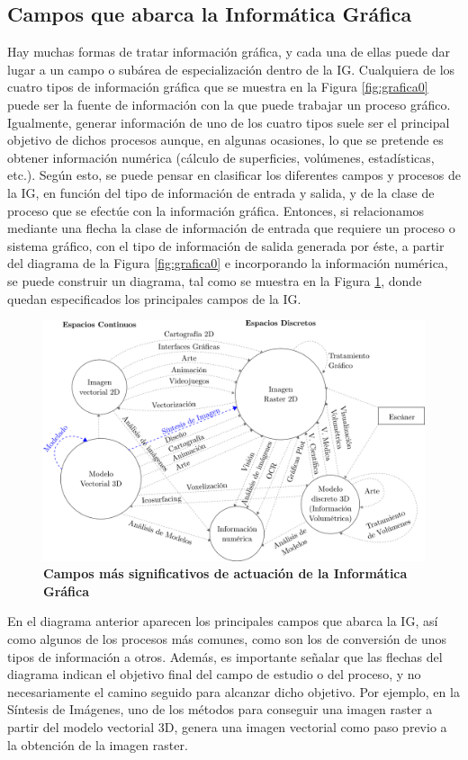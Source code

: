 \subsection{Campos que abarca la Informática Gráfica}
Hay muchas formas de tratar información gráfica, y cada una de ellas puede dar lugar a un campo o subárea de especialización dentro de la IG.
Cualquiera de los cuatro tipos de información gráfica que se muestra en la Figura \ref{fig:grafica0} puede ser la fuente de información con la que puede trabajar un proceso gráfico. Igualmente, generar información de uno de los cuatro tipos suele ser el principal objetivo de dichos procesos aunque, en algunas ocasiones, lo que se pretende es obtener información numérica (cálculo de superficies, volúmenes, estadísticas, etc.).
Según esto, se puede pensar en clasificar los diferentes campos y procesos de la IG, en función del tipo de información de entrada y salida, y de la clase de proceso que se efectúe con la información gráfica.
Entonces, si relacionamos mediante una flecha la clase de información de entrada que requiere un proceso o sistema gráfico, con el tipo de información de salida generada por éste, a partir del diagrama de la Figura \ref{fig:grafica0} e incorporando la información numérica, se puede construir un diagrama, tal como se muestra en la Figura \ref{fig:grafica1}, donde quedan especificados los principales campos de la IG.

\begin{figure}[h]
\includegraphics[width=16cm]{Img/CPD/grafica1.png}
\centering
\caption{\textbf{\footnotesize{Campos más significativos de actuación de la Informática Gráfica}}}
\label{fig:grafica1}
\end{figure}

En el diagrama anterior aparecen los principales campos que abarca la IG, así como algunos de los procesos más comunes, como son los de conversión de unos tipos de información a otros. Además, es importante señalar que las flechas del diagrama indican el objetivo final del campo de estudio o del proceso, y no necesariamente el camino seguido para alcanzar dicho objetivo. Por ejemplo, en la Síntesis de Imágenes, uno de los métodos para conseguir una imagen raster a partir del modelo vectorial 3D, genera una imagen vectorial como paso previo a la obtención de la imagen raster.

